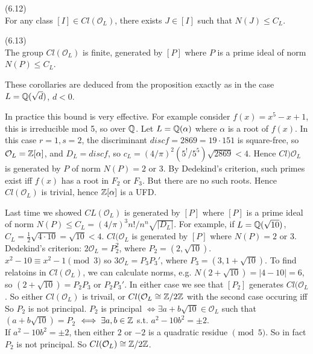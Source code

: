 \documentclass[a4paper]{article}
\begin{document}
\begin{coro} (6.12)\\
For any class $[I] \in Cl(\mathcal{O}_L)$, there exists $J \in [I]$ such that $N(J) \leq C_L$.
\end{coro}

\begin{coro} (6.13)\\
The group $Cl(\mathcal{O}_L)$ is finite, generated by $[P]$ where $P$ is a prime ideal of norm $N(P) \leq C_L$.
\end{coro}

These corollaries are deduced from the proposition exactly as in the case $L=\mathbb{Q}(\sqrt{d})$, $d<0$.

\begin{rem}
In practice this bound is very effective. For example consider $f(x) = x^5 -x+1$, this is irreducible mod 5, so over $\mathbb{Q}$. Let $L=\mathbb{Q}(\alpha)$ where $\alpha$ is a root of $f(x)$. In this case $r=1,s=2$, the discriminant $disc f = 2869 = 19 \cdot 151$ is square-free, so $\mathcal{O}_L = \mathbb{Z}[\alpha]$, and $D_L = disc f$, so $c_L =(4/\pi)^2 (5^!/5^5) \sqrt{2869} < 4$. Hence $Cl)\mathcal{O}_L$ is generated by $P$ of norm $N(P) = 2$ or $3$. By Dedekind's criterion, such primes exist iff $f(x)$ has a root in $F_2$ or $F_3$. But there are no such roots. Hence $Cl(\mathcal{O}_L)$ is trivial, hence $\mathbb{Z}[\alpha]$ is a UFD.
\end{rem}

Last time we showed $CL(\mathcal{O}_L)$ is generated by $[P]$ where $[P]$ is a prime ideal of norm $N(P) \leq C_L = (4/\pi)^3 n!/n^n \sqrt{|D_L|}$. For example, if $L=\mathbb{Q}(\sqrt{10})$, $C_L = \frac{1}{2} \sqrt{4 \cdot 10} = \sqrt{10} < 4$. $Cl(\mathcal{O}_L$ is generated by $[P]$ where $N(P) = 2$ or $3$. \\
Dedekind's criterion: $2\mathcal{O}_L = P_2^2$, where $P_2 = (2,\sqrt{10})$. $x^2 -10 \equiv x^2-1 \pmod 3$ so $3\mathcal{O}_L = P_3 P_3'$, where $P_3 = (3,1+\sqrt{10})$. To find relatoins in $Cl(\mathcal{O}_L)$, we can calculate norms, e.g. $N(2+\sqrt{10}) = |4-10| = 6$, so $(2+\sqrt{10}) = P_2 P_3$ or $P_2 P_3'$. In either case we see that $[P_2]$ generates $Cl(\mathcal{O}_L$. So either $Cl(\mathcal{O}_L)$ is trivail, or $Cl(\mathcal{O}_L \cong \mathbb{Z}/2\mathbb{Z}$ with the second case occuring iff So $P_2$ is not principal. $P_2$ is principal $\iff \exists a+b\sqrt{10} \in \mathcal{O}_L$ such that $(a+b\sqrt{10}) = P_2$ $\iff \exists a,b \in \mathbb{Z}$ s.t. $a^2 - 10b^2 = \pm 2$.\\
If $a^2-10b^2 = \pm 2$, then either $2$ or $-2$ is a quadratic residue $\pmod 5$. So in fact $P_2$ is not principal. So $Cl(\mathcal{O}_L) \cong \mathbb{Z}/2\mathbb{Z}$.
\end{document}
